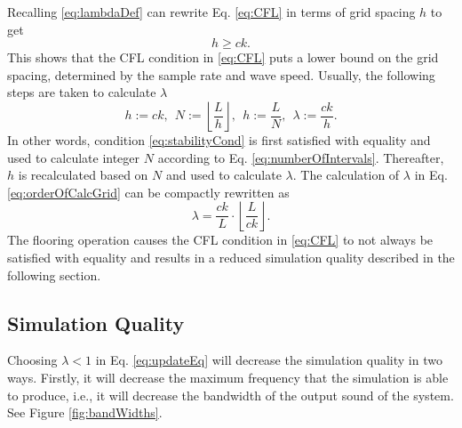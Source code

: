 Recalling \eqref{eq:lambdaDef} can rewrite Eq. \eqref{eq:CFL} in terms of grid spacing $h$ to get
\begin{equation}\label{eq:stabilityCond}
    h \geq ck.
\end{equation}
This shows that the CFL condition in \eqref{eq:CFL} puts a lower bound on the grid spacing, determined by the sample rate and wave speed. Usually, the following steps are taken to calculate $\lambda$
\begin{equation}\label{eq:orderOfCalcGrid}
    h := ck,\ \ N := \left\lfloor\frac{L}{h}\right\rfloor, \ \ h := \frac{L}{N}, \ \ \lambda := \frac{ck}{h}.
\end{equation}
In other words, condition \eqref{eq:stabilityCond} is first satisfied with equality and used to calculate integer $N$ according to Eq. \eqref{eq:numberOfIntervals}. Thereafter, $h$ is recalculated based on $N$ and used to calculate $\lambda$. The calculation of $\lambda$ in Eq. \eqref{eq:orderOfCalcGrid} can be compactly rewritten as
\begin{equation}\label{eq:compactLambda}
    \lambda = \frac{ck}{L}\cdot\left\lfloor\frac{L}{ck}\right\rfloor.
\end{equation}
The flooring operation causes the CFL condition in \eqref{eq:CFL} to not always be satisfied with equality and results in a reduced simulation quality described in the following section.

\subsection{Simulation Quality}\label{sec:quality}
Choosing $\lambda < 1$ in Eq. \eqref{eq:updateEq} will decrease the simulation quality in two ways. Firstly, it will decrease the maximum frequency that the simulation is able to produce, i.e., it will decrease the bandwidth of the output sound of the system. See Figure \ref{fig:bandWidths}.

